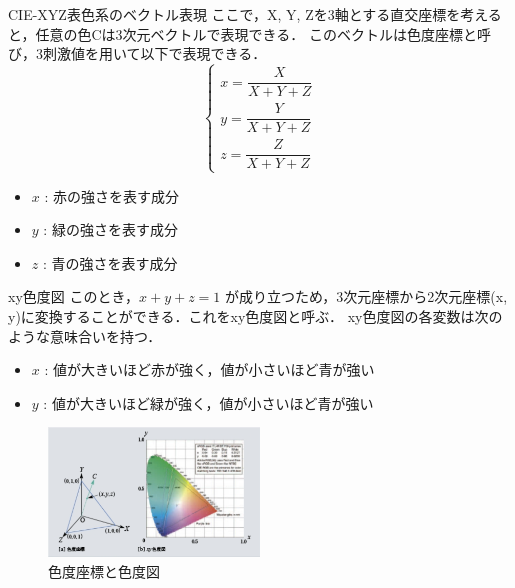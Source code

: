 \documentclass[8pt, jfont=ipaexm, t]{beamer} %
\begin{document}
\begin{frame}[allowframebreaks]{CIE-XYZ表色系のベクトル表現}
ここで，X, Y, Zを3軸とする直交座標を考えると，任意の色Cは3次元ベクトルで表現できる．
このベクトルは色度座標と呼び，3刺激値を用いて以下で表現できる． 
\begin{equation}
\left\{
\begin{aligned}
    x = \dfrac{X}{X + Y + Z} \\
    y = \dfrac{Y}{X + Y + Z} \\
    z = \dfrac{Z}{X + Y + Z} 
\end{aligned}
\right.
\end{equation}
\begin{block}{}
  \begin{itemize}
    \item \(x\) : 赤の強さを表す成分
    \item \(y\) : 緑の強さを表す成分
    \item \(z\) : 青の強さを表す成分 
  \end{itemize}
\end{block}
\end{frame}

\begin{frame}{xy色度図}
このとき，\(x + y + z = 1\) が成り立つため，3次元座標から2次元座標(x,
y)に変換することができる．これをxy色度図と呼ぶ．
xy色度図の各変数は次のような意味合いを持つ． 
\begin{itemize}
  \item \(x\) : 値が大きいほど赤が強く，値が小さいほど青が強い
  \item \(y\) : 値が大きいほど緑が強く，値が小さいほど青が強い 
\end{itemize}
\begin{figure}
  \centering
  \includegraphics[width=0.5\textwidth]{./figure/028.png}
  \caption{色度座標と色度図}
  \label{fig:xy}
\end{figure}
\end{frame}
\end{document}
